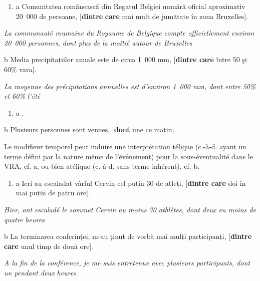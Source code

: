 \begin{enumerate}
\item \label{bkm:Ref295407351}a  Comunitatea românească din Regatul Belgiei numără oficial aproximativ 20~000 de persoane, [\textbf{dintre} \textbf{care} mai mult de jumătate în zona Bruxelles].  


\end{enumerate}
{\itshape
La communauté roumaine du Royaume de Belgique compte officiellement environ 20~000 personnes, dont plus de la moitié autour de Bruxelles}

  b  Media precipitațiilor anuale este de circa 1~000 mm, [\textbf{dintre care} între 50 şi 60\% vara].

{\itshape
La moyenne des précipitations annuelles est d'environ 1~000 mm, dont entre 50\% et 60\% l'été } 


\begin{enumerate}
\item \label{bkm:Ref295407354}a  \textstyleapplestylespan{En Amérique latine, 23 journalistes ont trouvé la mort, [}\textstyleapplestylespan{ 9 en Colombie et 7 au Pérou]}. 


\end{enumerate}
  b  Plusieurs personnes sont venues, [\textbf{dont} une ce matin].

Le modifieur temporel peut induire une interprétation télique (c.-à-d. ayant un terme défini par la nature même de l'événement) pour la sous-éventualité dans le VRA, cf. a, ou bien atélique (c.-à-d. sans terme inhérent), cf. b.


\begin{enumerate}
\item \label{bkm:Ref295414301}a  Ieri au escaladat vârful Cervin cel puțin 30 de atleți, [\textbf{dintre care} doi în mai puțin de patru ore].  


\end{enumerate}
{\itshape
Hier, ont escaladé le sommet Cervin au moins 30 athlètes, dont deux en moins de quatre heures}

  b  La terminarea conferinței, m-au ținut de vorbă mai mulți participanți, [\textbf{dintre} \textbf{care} unul timp de două ore].

{\itshape
A la fin de la conférence, je me suis entretenue avec plusieurs participants, dont un pendant deux heures } 

